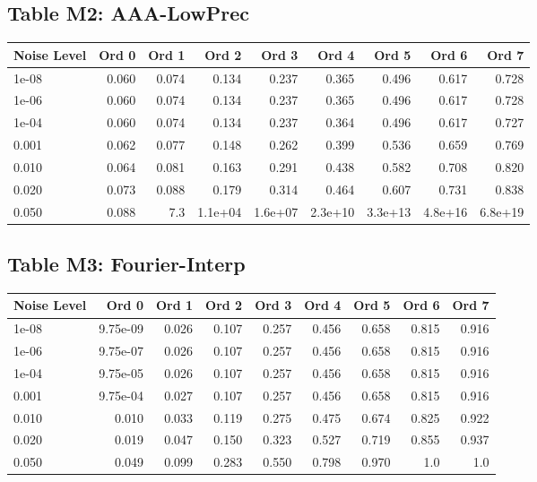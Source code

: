 \documentclass[10pt]{article}
\begin{document}
\clearpage

\subsection*{Table M2: AAA-LowPrec}

\begin{longtable}{lrrrrrrrr}
\toprule
\textbf{Noise Level} & \textbf{Ord 0} & \textbf{Ord 1} & \textbf{Ord 2} & \textbf{Ord 3} & \textbf{Ord 4} & \textbf{Ord 5} & \textbf{Ord 6} & \textbf{Ord 7} \\
\midrule
\endhead
1e-08 & 0.060 & 0.074 & 0.134 & 0.237 & 0.365 & 0.496 & 0.617 & 0.728 \\
1e-06 & 0.060 & 0.074 & 0.134 & 0.237 & 0.365 & 0.496 & 0.617 & 0.728 \\
1e-04 & 0.060 & 0.074 & 0.134 & 0.237 & 0.364 & 0.496 & 0.617 & 0.727 \\
0.001 & 0.062 & 0.077 & 0.148 & 0.262 & 0.399 & 0.536 & 0.659 & 0.769 \\
0.010 & 0.064 & 0.081 & 0.163 & 0.291 & 0.438 & 0.582 & 0.708 & 0.820 \\
0.020 & 0.073 & 0.088 & 0.179 & 0.314 & 0.464 & 0.607 & 0.731 & 0.838 \\
0.050 & 0.088 & 7.3 & 1.1e+04 & 1.6e+07 & 2.3e+10 & 3.3e+13 & 4.8e+16 & 6.8e+19 \\
\bottomrule
\end{longtable}

\clearpage

\subsection*{Table M3: Fourier-Interp}

\begin{longtable}{lrrrrrrrr}
\toprule
\textbf{Noise Level} & \textbf{Ord 0} & \textbf{Ord 1} & \textbf{Ord 2} & \textbf{Ord 3} & \textbf{Ord 4} & \textbf{Ord 5} & \textbf{Ord 6} & \textbf{Ord 7} \\
\midrule
\endhead
1e-08 & 9.75e-09 & 0.026 & 0.107 & 0.257 & 0.456 & 0.658 & 0.815 & 0.916 \\
1e-06 & 9.75e-07 & 0.026 & 0.107 & 0.257 & 0.456 & 0.658 & 0.815 & 0.916 \\
1e-04 & 9.75e-05 & 0.026 & 0.107 & 0.257 & 0.456 & 0.658 & 0.815 & 0.916 \\
0.001 & 9.75e-04 & 0.027 & 0.107 & 0.257 & 0.456 & 0.658 & 0.815 & 0.916 \\
0.010 & 0.010 & 0.033 & 0.119 & 0.275 & 0.475 & 0.674 & 0.825 & 0.922 \\
0.020 & 0.019 & 0.047 & 0.150 & 0.323 & 0.527 & 0.719 & 0.855 & 0.937 \\
0.050 & 0.049 & 0.099 & 0.283 & 0.550 & 0.798 & 0.970 & 1.0 & 1.0 \\
\bottomrule
\end{longtable}
\end{document}
